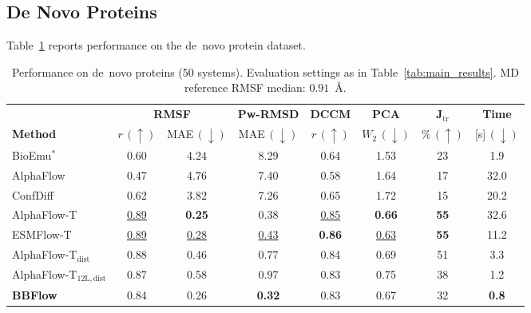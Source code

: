 \documentclass[12pt,a4paper]{article}
\begin{document}
\subsection{De Novo Proteins}
\label{sec:denovo_results}

Table~\ref{tab:denovo_results} reports performance on the de~novo protein dataset.

\begin{table}[h]
  \centering
  \caption{Performance on de~novo proteins (50 systems).  Evaluation settings as in
    Table~\ref{tab:main_results}.  MD reference RMSF median: $0.91$~Å.}
  \label{tab:denovo_results}
  \small
  \begin{tabular}{lccccccc}
    \toprule
    & \multicolumn{2}{c}{\textbf{RMSF}} & \textbf{Pw-RMSD} & \textbf{DCCM}
      & \textbf{PCA} & $\bm{J_{\mathrm{tr}}}$ & \textbf{Time} \\
    \cmidrule(lr){2-3}
    \textbf{Method} & $r\,(\uparrow)$ & MAE$\,(\downarrow)$ & MAE$\,(\downarrow)$
      & $r\,(\uparrow)$ & $W_2\,(\downarrow)$ & $\%\,(\uparrow)$ & [s]$\,(\downarrow)$ \\
    \midrule
    BioEmu$^*$        & 0.60 & 4.24 & 8.29 & 0.64 & 1.53 & 23 & 1.9 \\
    AlphaFlow         & 0.47 & 4.76 & 7.40 & 0.58 & 1.64 & 17 & 32.0 \\
    ConfDiff          & 0.62 & 3.82 & 7.26 & 0.65 & 1.72 & 15 & 20.2 \\
    AlphaFlow-T       & \underline{0.89} & \textbf{0.25} & 0.38 & \underline{0.85} & \textbf{0.66} & \textbf{55} & 32.6 \\
    ESMFlow-T         & \underline{0.89} & \underline{0.28} & \underline{0.43} & \textbf{0.86} & \underline{0.63} & \textbf{55} & 11.2 \\
    AlphaFlow-T$_{\mathrm{dist}}$ & 0.88 & 0.46 & 0.77 & 0.84 & 0.69 & 51 & 3.3 \\
    AlphaFlow-T$_{12\mathrm{L,dist}}$ & 0.87 & 0.58 & 0.97 & 0.83 & 0.75 & 38 & 1.2 \\
    \midrule
    \textbf{BBFlow}   & 0.84 & 0.26 & \textbf{0.32} & 0.83 & 0.67 & 32 & \textbf{0.8} \\
    \bottomrule
  \end{tabular}
\end{table}
\end{document}
